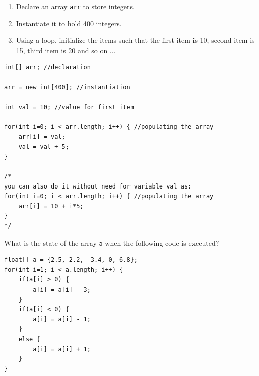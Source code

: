 \begin{questions}
\begin{solution}
\vskip 0.5cm
\end{solution}

\question 

\begin{enumerate}
\item Declare an array \texttt{arr} to store integers. 
\item Instantiate it to hold 400 integers. 
\item Using a loop, initialize the items such that the first item is 10, second item is 15, third item is 20 and so on ...
\end{enumerate}

\begin{solution}
\begin{lstlisting}
int[] arr; //declaration

arr = new int[400]; //instantiation

int val = 10; //value for first item

for(int i=0; i < arr.length; i++) { //populating the array
	arr[i] = val;
	val = val + 5;
}

/*
you can also do it without need for variable val as:
for(int i=0; i < arr.length; i++) { //populating the array
	arr[i] = 10 + i*5;
}
*/
\end{lstlisting}
\end{solution}

\question What is the state of the array \texttt{a} when the following code is executed?

\begin{lstlisting}
float[] a = {2.5, 2.2, -3.4, 0, 6.8};
for(int i=1; i < a.length; i++) {
	if(a[i] > 0) {
		a[i] = a[i] - 3;
	}	
	if(a[i] < 0) {
		a[i] = a[i] - 1;
	}
	else {
		a[i] = a[i] + 1;
	}
}
\end{lstlisting}


\end{questions}
